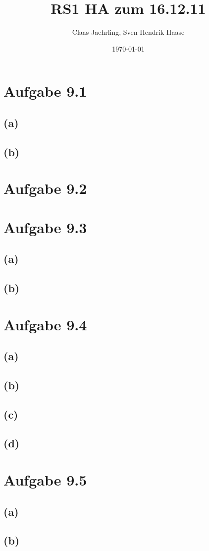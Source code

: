 \documentclass[12pt]{article}
\author{Claas Jaehrling, Sven-Hendrik Haase}
\title{RS1 HA zum 16.12.11}
\date{\today}
\begin{document}
\setcounter{secnumdepth}{0}
\maketitle

\section{Aufgabe 9.1}
\subsection{(a)}
\subsection{(b)}

\section{Aufgabe 9.2}

\section{Aufgabe 9.3}
\subsection{(a)}
\subsection{(b)}

\section{Aufgabe 9.4}
\subsection{(a)}
\subsection{(b)}
\subsection{(c)}
\subsection{(d)}

\section{Aufgabe 9.5}
\subsection{(a)}
\subsection{(b)}
\end{document}
